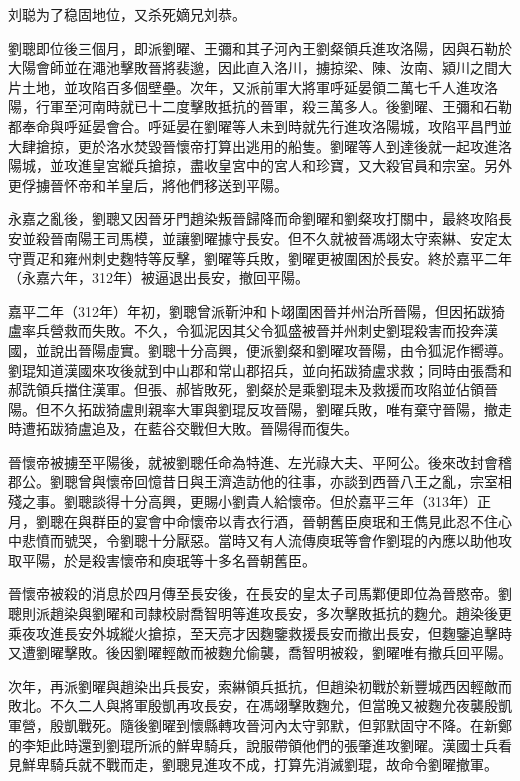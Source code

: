 刘聪为了稳固地位，又杀死嫡兄刘恭。

劉聰即位後三個月，即派劉曜、王彌和其子河內王劉粲領兵進攻洛陽，因與石勒於大陽會師並在澠池擊敗晉將裴邈，因此直入洛川，擄掠梁、陳、汝南、潁川之間大片土地，並攻陷百多個壁壘。次年，又派前軍大將軍呼延晏領二萬七千人進攻洛陽，行軍至河南時就已十二度擊敗抵抗的晉軍，殺三萬多人。後劉曜、王彌和石勒都奉命與呼延晏會合。呼延晏在劉曜等人未到時就先行進攻洛陽城，攻陷平昌門並大肆搶掠，更於洛水焚毀晉懷帝打算出逃用的船隻。劉曜等人到達後就一起攻進洛陽城，並攻進皇宮縱兵搶掠，盡收皇宮中的宮人和珍寶，又大殺官員和宗室。另外更俘擄晉怀帝和羊皇后，將他們移送到平陽。

永嘉之亂後，劉聰又因晉牙門趙染叛晉歸降而命劉曜和劉粲攻打關中，最終攻陷長安並殺晉南陽王司馬模，並讓劉曜據守長安。但不久就被晉馮翊太守索綝、安定太守賈疋和雍州刺史麴特等反擊，劉曜等兵敗，劉曜更被圍困於長安。終於嘉平二年（永嘉六年，312年）被逼退出長安，撤回平陽。

嘉平二年（312年）年初，劉聰曾派靳沖和卜翊圍困晉并州治所晉陽，但因拓跋猗盧率兵營救而失敗。不久，令狐泥因其父令狐盛被晉并州刺史劉琨殺害而投奔漢國，並說出晉陽虛實。劉聰十分高興，便派劉粲和劉曜攻晉陽，由令狐泥作嚮導。劉琨知道漢國來攻後就到中山郡和常山郡招兵，並向拓跋猗盧求救；同時由張喬和郝詵領兵擋住漢軍。但張、郝皆敗死，劉粲於是乘劉琨未及救援而攻陷並佔領晉陽。但不久拓跋猗盧則親率大軍與劉琨反攻晉陽，劉曜兵敗，唯有棄守晉陽，撤走時遭拓跋猗盧追及，在藍谷交戰但大敗。晉陽得而復失。

晉懷帝被擄至平陽後，就被劉聰任命為特進、左光祿大夫、平阿公。後來改封會稽郡公。劉聰曾與懷帝回憶昔日與王濟造訪他的往事，亦談到西晉八王之亂，宗室相殘之事。劉聰談得十分高興，更賜小劉貴人給懷帝。但於嘉平三年（313年）正月，劉聰在與群臣的宴會中命懷帝以青衣行酒，晉朝舊臣庾珉和王儁見此忍不住心中悲憤而號哭，令劉聰十分厭惡。當時又有人流傳庾珉等會作劉琨的內應以助他攻取平陽，於是殺害懷帝和庾珉等十多名晉朝舊臣。

晉懷帝被殺的消息於四月傳至長安後，在長安的皇太子司馬鄴便即位為晉愍帝。劉聰則派趙染與劉曜和司隸校尉喬智明等進攻長安，多次擊敗抵抗的麴允。趙染後更乘夜攻進長安外城縱火搶掠，至天亮才因麴鑒救援長安而撤出長安，但麴鑒追擊時又遭劉曜擊敗。後因劉曜輕敵而被麴允偷襲，喬智明被殺，劉曜唯有撤兵回平陽。

次年，再派劉曜與趙染出兵長安，索綝領兵抵抗，但趙染初戰於新豐城西因輕敵而敗北。不久二人與將軍殷凱再攻長安，在馮翊擊敗麴允，但當晚又被麴允夜襲殷凱軍營，殷凱戰死。隨後劉曜到懷縣轉攻晉河內太守郭默，但郭默固守不降。在新鄭的李矩此時還到劉琨所派的鮮卑騎兵，說服帶領他們的張肇進攻劉曜。漢國士兵看見鮮卑騎兵就不戰而走，劉聰見進攻不成，打算先消滅劉琨，故命令劉曜撤軍。

